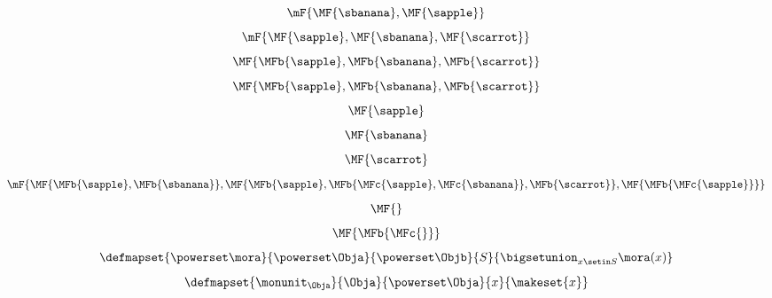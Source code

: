 {\begin{forslides}
\begin{equation}
        \end{equation}
        \begin{equation}
            \label{eq:fruit-sum-12}
            \mF{\MF{\sbanana} , \MF{\sapple}}
        \end{equation}
        \begin{equation}
            \label{eq:fruit-sum-13}
            \mF{\MF{\sapple}   ,  \MF{\sbanana}  ,  \MF{\scarrot}}
        \end{equation}
        \begin{equation}
            \label{eq:fruit-sum-14}
            \MF{\MFb{\sapple}   ,  \MFb{\sbanana}  ,  \MFb{\scarrot}}
        \end{equation}
        \begin{equation}
            \label{eq:fruit-sum-15}
            \MF{\MFb{\sapple}  ,  \MFb{\sbanana}  ,  \MFb{\scarrot}}
        \end{equation}
        \begin{equation}
            \label{eq:fruit-sum-16}
            \MF{\sapple}
        \end{equation}
        \begin{equation}
            \label{eq:fruit-sum-17}
            \MF{\sbanana}
        \end{equation}
        \begin{equation}
            \label{eq:fruit-sum-18}
            \MF{\scarrot}
        \end{equation}
        \begin{equation}
            \label{eq:fruit-sum-20}
            \mF{
                \MF{\MFb{\sapple}  , \MFb{\sbanana}},
                \MF{\MFb{\sapple}   , \MFb{\MFc{\sapple}, \MFc{\sbanana}} ,  \MFb{\scarrot}},
                \MF{\MFb{\MFc{\sapple}}}
            }
        \end{equation}
        \begin{equation}
            \label{eq:fruit-sum-21-empty}
            \MF{}
        \end{equation}
        \begin{equation}
            \label{eq:fruit-sum-22-empty}
            \MF{\MFb{\MFc{}}}
        \end{equation}
        \begin{equation}
            \label{eq:monad-power-functor}
            \defmapset{
                \powerset \mora
            }{
                \powerset \Obja
            }{
                \powerset \Objb
            }{
                S
            }{
                \bigsetunion_{x\setin S} \mora(x)
            }
        \end{equation}
        \begin{equation}
            \label{eq:monad-power-monunit}
            \defmapset{
                \monunit_\Obja
            }{
                \Obja
            }{
                \powerset\Obja
            }{
                x
            }{
                \makeset{ x }
            }
        \end{equation}


\end{forslides}}
